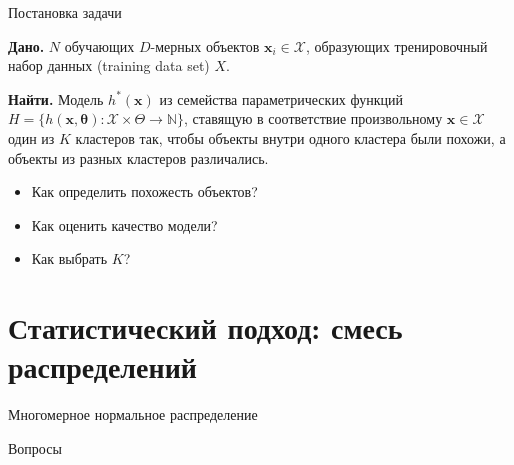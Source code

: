 \documentclass[10pt]{beamer}
\begin{document}
\begin{frame}{Постановка задачи}

{\bf Дано.} $N$ обучающих $D$-мерных объектов $\mathbf{x}_i \in \mathcal{X}$, образующих тренировочный набор данных (training data set) $X$.

\vspace{1em}
{\bf Найти.} Модель $h^*(\mathbf{x})$ из семейства параметрических функций $H = \{h(\mathbf{x, \mathbf{\theta}}): \mathcal{X} \times \Theta \rightarrow \mathbb{N}\}$, ставящую в соответствие произвольному $\mathbf{x} \in \mathcal{X}$ один из $K$ кластеров так, чтобы объекты внутри одного кластера были похожи, а объекты из разных кластеров различались.

\vspace{1em}
\begin{itemize}
\item Как определить похожесть объектов?
\item Как оценить качество модели?
\item Как выбрать $K$?
\end{itemize}

\end{frame}

\section{Статистический подход: смесь распределений}

\begin{frame}{Многомерное нормальное распределение}

\end{frame}

\begin{frame}[plain]
\begin{center}
{\Large Вопросы}
\end{center}
\end{frame}
\end{document}
